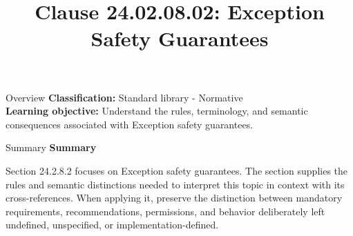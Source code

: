 \documentclass[10pt,letterpaper]{article}
\title{Clause 24.02.08.02: Exception Safety Guarantees}
\author{}
\date{}
\begin{document}
\maketitle
\begin{CornellOverviewBox}{Overview}
\textbf{Classification:} Standard library - Normative\\[2pt]
\textbf{Learning objective:} Understand the rules, terminology, and semantic consequences associated with Exception safety guarantees.
\end{CornellOverviewBox}\begin{CornellSummaryBox}{Summary}
{\sffamily\bfseries\color{Accent} Summary}\par\vspace{3pt}Section 24.2.8.2 focuses on Exception safety guarantees. The section supplies the rules and semantic distinctions needed to interpret this topic in context with its cross-references. When applying it, preserve the distinction between mandatory requirements, recommendations, permissions, and behavior deliberately left undefined, unspecified, or implementation-defined.
\end{CornellSummaryBox}
\end{document}
